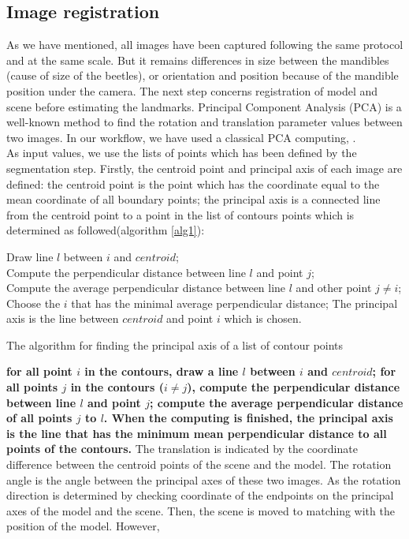 \documentclass[twoside,twocolumn,10pt]{article}
\begin{document}
\subsection{Image registration}
As we have mentioned, all images have been captured following the same protocol and at the same scale. But it remains differences in size between the mandibles (cause of size of the beetles), or orientation and position because of the mandible position under the camera. The next step concerns registration of model and scene before estimating the landmarks. Principal Component Analysis (PCA) is a well-known method to find the rotation and translation parameter values between two images. In our workflow, we have used a classical PCA computing\cite{bsspca}, \cite{shlens2014tutorial}.\\

As input values, we use the lists of points which has been defined by the segmentation step. Firstly, the centroid point and principal axis of each image are defined: the centroid point is the point which has the coordinate equal to the mean coordinate of all boundary points; the principal axis is a connected line from the centroid point to a point in the list of contours points which is determined as followed(algorithm \ref{alg1}):
\begin{algorithm}
	{
		Draw line $l$ between $i$ and $centroid$;\\
		{
			{
				Compute the perpendicular distance between line $l$ and point $j$;\\
			}		
		}
		Compute the average perpendicular distance between line $l$ and other point $j \neq i$;\\
		Choose the $i$ that has the minimal average perpendicular distance;
	}
	The principal axis is the line between $centroid$ and point $i$ which is chosen.
	\caption{The algorithm for finding the principal axis of a list of contour points}
	\label{alg1}
\end{algorithm}
\textbf{
for all point \textit{$i$} in the contours, draw a line \textit{$l$} between \textit{$i$} and \textit{$centroid$}; for all points \textit{$j$} in the contours (\textit{$i \neq j$}), compute the perpendicular distance between line \textit{$l$} and point \textit{$j$}; compute the average perpendicular distance of all points $j$ to $l$. When the computing is finished, the principal axis is the line that has the minimum mean perpendicular distance to all points of the contours.} The translation is indicated by the coordinate difference between the centroid points of the scene and the model. The rotation angle is the angle between the principal axes of these two images. As the rotation direction is determined by checking coordinate of the endpoints on the principal axes of the model and the scene. Then, the scene is moved to matching with the position of the model. However,
\end{document}
